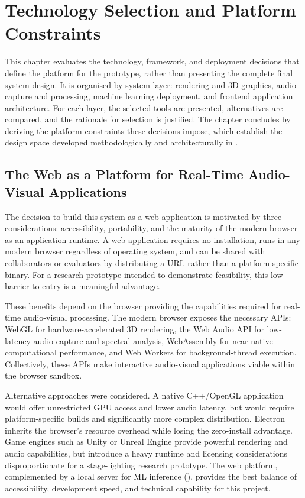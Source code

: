 \chapter{Technology Selection and Platform Constraints}
\label{chap:technologies-and-platform-constraints}

This chapter evaluates the technology, framework, and deployment decisions that define the platform for the prototype, rather than presenting the complete final system design. It is organised by system layer: rendering and 3D graphics, audio capture and processing, machine learning deployment, and frontend application architecture. For each layer, the selected tools are presented, alternatives are compared, and the rationale for selection is justified. The chapter concludes by deriving the platform constraints these decisions impose, which establish the design space developed methodologically and architecturally in .

\section{The Web as a Platform for Real-Time Audio-Visual Applications}

The decision to build this system as a web application is motivated by three considerations: accessibility, portability, and the maturity of the modern browser as an application runtime. A web application requires no installation, runs in any modern browser regardless of operating system, and can be shared with collaborators or evaluators by distributing a URL rather than a platform-specific binary. For a research prototype intended to demonstrate feasibility, this low barrier to entry is a meaningful advantage.

These benefits depend on the browser providing the capabilities required for real-time audio-visual processing. The modern browser exposes the necessary APIs: WebGL for hardware-accelerated 3D rendering, the Web Audio API for low-latency audio capture and spectral analysis, WebAssembly for near-native computational performance, and Web Workers for background-thread execution. Collectively, these APIs make interactive audio-visual applications viable within the browser sandbox.

Alternative approaches were considered. A native C++/OpenGL application would offer unrestricted GPU access and lower audio latency, but would require platform-specific builds and significantly more complex distribution. Electron inherits the browser's resource overhead while losing the zero-install advantage. Game engines such as Unity or Unreal Engine provide powerful rendering and audio capabilities, but introduce a heavy runtime and licensing considerations disproportionate for a stage-lighting research prototype. The web platform, complemented by a local server for ML inference (), provides the best balance of accessibility, development speed, and technical capability for this project.


